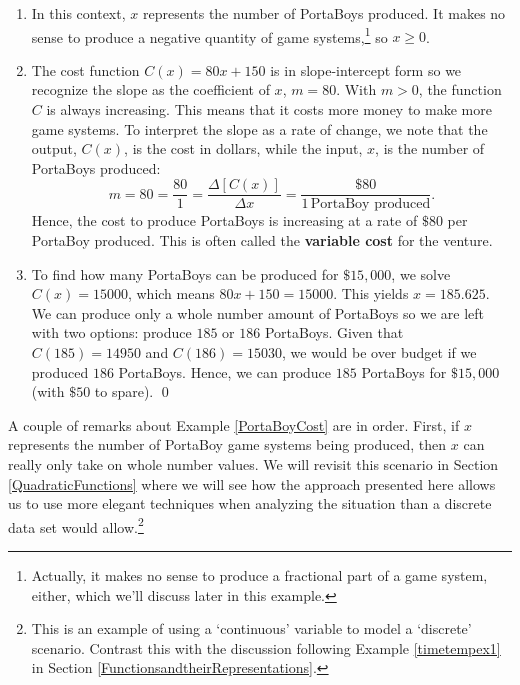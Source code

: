 \begin{ex}
\begin{enumerate}
\begin{center}
\end{center}

\item   In this context, $x$ represents the number of PortaBoys produced.  It makes no sense to produce a negative quantity of game systems,\footnote{Actually, it makes no sense to produce a fractional part of a game system, either, which we'll discuss later in this example.}  so $x \geq 0$.


\item  The cost function $C(x)= 80x + 150$ is in slope-intercept form so we recognize the slope as the coefficient of $x$, $m = 80$.  With $m > 0$, the function $C$ is always increasing.  This means that it costs more money to make more game systems.  To interpret the slope as a rate of change, we note that the output, $C(x)$, is the cost in dollars, while the input, $x$,  is the number of PortaBoys produced:  \[ m = 80 = \dfrac{80}{1} =  \dfrac{\Delta [C(x)]}{\Delta x} = \dfrac{\$ 80}{1 \, \mbox{PortaBoy produced}}.\]  Hence, the cost to produce PortaBoys is increasing at a rate of $\$80$ per PortaBoy produced.  This is often called the \textbf{variable cost} for the venture. 


\item  To find how many PortaBoys can be produced for $\$15, \! 000$, we solve $C(x) = 15000$, which means $80x+150 = 15000$.  This yields  $x = 185.625$.  We can produce only a whole number amount of PortaBoys so we are left with two options: produce $185$ or $186$ PortaBoys.  Given that $C(185) =  14950$ and $C(186) = 15030$, we would be over budget if we produced $186$ PortaBoys.  Hence, we can produce $185$ PortaBoys for $\$15, \! 000$ (with $\$50$ to spare). \qed

\end{enumerate}

\end{ex}

A couple of remarks about Example \ref{PortaBoyCost} are in order.  First, if $x$ represents the number of PortaBoy game systems being produced, then $x$ can really only take on whole number values.  We will revisit this scenario in Section \ref{QuadraticFunctions} where we will see how the approach presented here allows us to use more elegant techniques when analyzing the situation than a discrete data set would allow.\footnote{This is an example of using a `continuous' variable to model a `discrete' scenario.  Contrast this with the discussion following Example \ref{timetempex1} in Section \ref{FunctionsandtheirRepresentations}.} 

